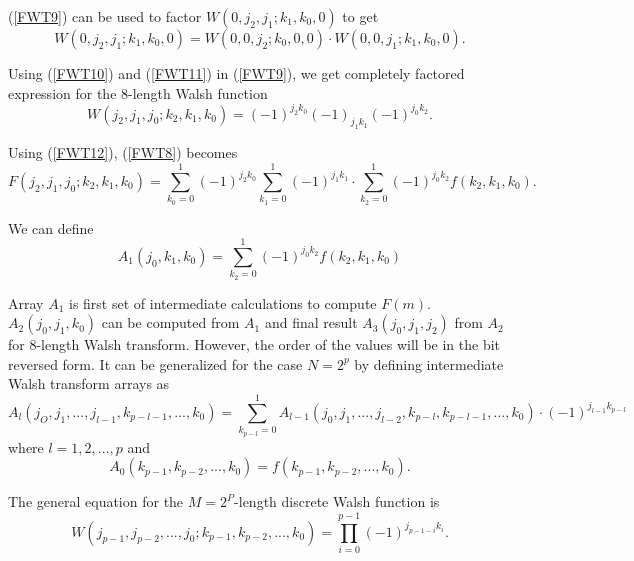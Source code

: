 (\ref{FWT9}) can be used to factor $W(0,j_2,j_1;k_1,k_0,0)$ to get
\begin{equation}
\label{FWT11}
W(0,j_2,j_1;k_1,k_0,0) = W(0,0,j_2;k_0,0,0) \cdot W(0,0,j_1;k_1,k_0,0).
\end{equation}

Using (\ref{FWT10}) and (\ref{FWT11}) in (\ref{FWT9}), we get completely factored expression for the 8-length Walsh function
\begin{equation}
\label{FWT12}
W(j_2,j_1,j_0;k_2,k_1,k_0) = (-1)^{j_2k_0}(-1)_{j_1k_1}(-1)^{j_0k_2}.
\end{equation}

Using (\ref{FWT12}), (\ref{FWT8}) becomes 
\begin{equation}
\label{FWT13}
F(j_2,j_1,j_0;k_2,k_1,k_0) = \sum\limits_{k_0=0}^1 (-1)^{j_2k_0} \sum\limits_{k_1=0}^1 (-1)^{j_1k_1}  \cdot  \sum\limits_{k_2=0}^1 (-1)^{j_0k_2} f(k_2,k_1,k_0).
\end{equation}

We can define
\begin{equation}
\label{FWT14}
A_1(j_0,k_1,k_0) = \sum\limits_{k_2=0}^1 (-1)^{j_0k_2} f(k_2,k_1,k_0)
\end{equation}

Array $A_1$ is first set of intermediate calculations to compute $F(m)$. $A_2(j_0,j_1,k_0)$ can be computed from $A_1$ and final result $A_3(j_0,j_1,j_2)$ from $A_2$ for 8-length Walsh transform. However, the order of the values will be in the bit reversed form. It can be generalized for the case $N = 2^p$ by defining intermediate Walsh transform arrays as
\begin{equation}
\label{FWT15}
A_l(j_O,j_1,...,j_{l-1},k_{p-l-1},...,k_0) = \sum\limits_{k_{p-l}=0}^1 A_{l-1}(j_0,j_1,...,j_{l-2},k_{p-l},k_{p-l-1},...,k_0) \cdot (-1)^{j_{l-1}k_{p-l}}
\end{equation}
where $l = 1,2,...,p$ and 
\begin{equation}
\label{FWT16}
A_0(k_{p-1},k_{p-2},...,k_0) = f(k_{p-1},k_{p-2},...,k_0).
\end{equation}

The general equation for the $M= 2^P$-length discrete Walsh function is 
\[
W(j_{p-1},j_{p-2},...,j_0;k_{p-1},k_{p-2},...,k_0) = \prod_{i=0}^{p-1} (-1)^{j_{p-1-i}k_i}.
\]



